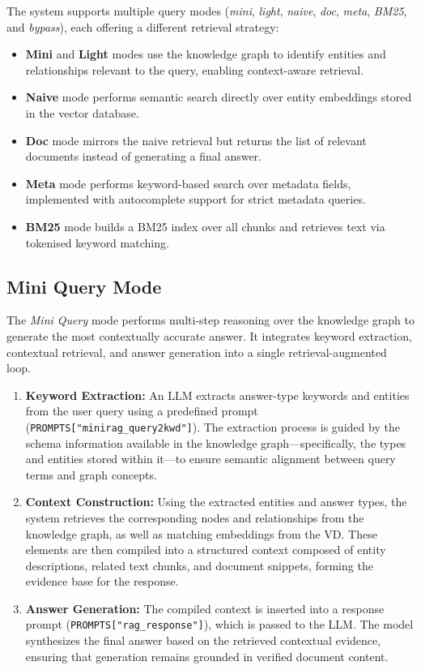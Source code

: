 The system supports multiple query modes (\textit{mini}, \textit{light}, \textit{naive}, \textit{doc}, \textit{meta}, \textit{BM25}, and \textit{bypass}), each offering a different retrieval strategy:
\begin{itemize}
    \item \textbf{Mini} and \textbf{Light} modes use the knowledge graph to identify entities and relationships relevant to the query, enabling context-aware retrieval.
    \item \textbf{Naive} mode performs semantic search directly over entity embeddings stored in the vector database.
    \item \textbf{Doc} mode mirrors the naive retrieval but returns the list of relevant documents instead of generating a final answer.
    \item \textbf{Meta} mode performs keyword-based search over metadata fields, implemented with autocomplete support for strict metadata queries.
    \item \textbf{BM25} mode builds a BM25 index over all chunks and retrieves text via tokenised keyword matching.
\end{itemize}
\subsection{Mini Query Mode}

The \textit{Mini Query} mode performs multi-step reasoning over the knowledge graph to generate the most contextually accurate answer.  
It integrates keyword extraction, contextual retrieval, and answer generation into a single retrieval-augmented loop.

\begin{enumerate}
    \item \textbf{Keyword Extraction:}  
    An \gls{LLM} extracts answer-type keywords and entities from the user query using a predefined prompt (\texttt{PROMPTS["minirag\_query2kwd"]}).
    The extraction process is guided by the schema information available in the knowledge graph—specifically, the types and entities stored within it—to ensure semantic alignment between query terms and graph concepts.
    
    \item \textbf{Context Construction:}  
    Using the extracted entities and answer types, the system retrieves the corresponding nodes and relationships from the knowledge graph, as well as matching embeddings from the \gls{VD}.
    These elements are then compiled into a structured context composed of entity descriptions, related text chunks, and document snippets, forming the evidence base for the response.
    
    \item \textbf{Answer Generation:}  
    The compiled context is inserted into a response prompt (\texttt{PROMPTS["rag\_response"]}), which is passed to the \gls{LLM}.
    The model synthesizes the final answer based on the retrieved contextual evidence, ensuring that generation remains grounded in verified document content.
\end{enumerate}

